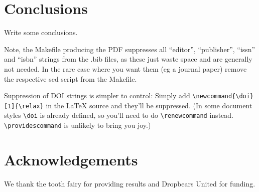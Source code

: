 \documentclass[10pt,conference,compsoc\ifDraft,draft\fi]{IEEEtran}
\newenvironment{acks}{\section*{Acknowledgements}}{}
\begin{document}
\section{Conclusions}\label{s:concl}

  Write some conclusions.

  Note, the Makefile producing the PDF suppresses all ``editor'',
  ``publisher'', ``issn'' and ``isbn'' strings from the .bib files, as
  these just waste space and are generally not needed. In the rare
  case where you want them (eg a journal paper) remove the respective
  sed script from the Makefile.

  Suppression of DOI strings is simpler to control: Simply add
  \verb|\newcommand{\doi}[1]{\relax}| in the \LaTeX{} source and
  they'll be suppressed. (In some document styles \verb|\doi| is
  already defined, so you'll need to do \verb|\renewcommand|
  instead. \verb|\providescommand| is unlikely to bring you joy.)

\begin{acks}
  We thank the tooth fairy for providing results and Dropbears United
  for funding.
\end{acks}

\balance
{\sloppy
  \ifUsenix\footnotesize\fi
  \ifACM
    
  \else
    \ifLNCS
      
    \else
      \ifAlpha
        
      \else
        
      \fi
    \fi %
  \fi   %

  
}
\end{document}
